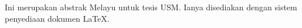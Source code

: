 \begin{MsAbstract}
Ini merupakan abstrak Melayu untuk tesis USM.  Ianya disediakan dengan sistem penyediaan dokumen \LaTeX.

\end{MsAbstract}
